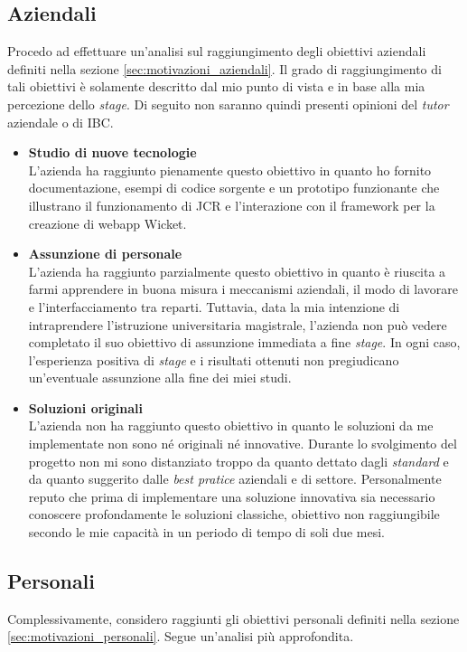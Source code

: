 	\subsection{Aziendali}
		Procedo ad effettuare un'analisi sul raggiungimento degli obiettivi aziendali definiti nella sezione \ref{sec:motivazioni_aziendali}. Il grado di raggiungimento di tali obiettivi è solamente descritto dal mio punto di vista e in base alla mia percezione dello \textit{stage}. Di seguito non saranno quindi presenti opinioni del \textit{tutor} aziendale o di IBC.
		\begin{itemize}
			\item \textbf{Studio di nuove tecnologie} \greencheck\\
				L'azienda ha raggiunto pienamente questo obiettivo in quanto ho fornito documentazione, esempi di codice sorgente e un prototipo funzionante che illustrano il funzionamento di JCR e l'interazione con il \gls{framework} per la creazione di \gls{webapp} Wicket.
			\item \textbf{Assunzione di personale} \yellowcheck\\
				L'azienda ha raggiunto parzialmente questo obiettivo in quanto è riuscita a farmi apprendere in buona misura i meccanismi aziendali, il modo di lavorare e l'interfacciamento tra reparti. Tuttavia, data la mia intenzione di intraprendere l'istruzione universitaria magistrale, l'azienda non può vedere completato il suo obiettivo di assunzione immediata a fine \textit{stage}. In ogni caso, l'esperienza positiva di \textit{stage} e i risultati ottenuti non pregiudicano un'eventuale assunzione alla fine dei miei studi. 
			\item \textbf{Soluzioni originali} \redx \\
				L'azienda non ha raggiunto questo obiettivo in quanto le soluzioni da me implementate non sono né originali né innovative. Durante lo svolgimento del progetto non mi sono distanziato troppo da quanto dettato dagli \textit{standard} e da quanto suggerito dalle \textit{best pratice} aziendali e di settore. Personalmente reputo che prima di implementare una soluzione innovativa sia necessario conoscere profondamente le soluzioni classiche, obiettivo non raggiungibile secondo le mie capacità in un periodo di tempo di soli due mesi.
		\end{itemize} 
	
	\subsection{Personali}
		Complessivamente, considero raggiunti gli obiettivi personali definiti nella sezione \ref{sec:motivazioni_personali}. Segue un'analisi più approfondita.

